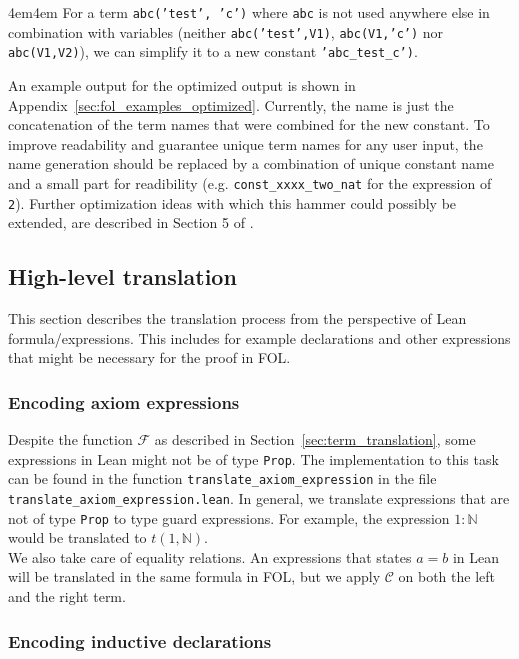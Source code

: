 \documentclass[a4paper]{article}
\newcommand{\F}[0]{$\mathcal{F}$ }
\newcommand{\C}[0]{$\mathcal{C}$ }
\begin{document}
\begingroup
\leftskip4em\rightskip4em
For a term \texttt{abc('test', 'c')} where \texttt{abc} is not used anywhere else in combination with variables (neither \texttt{abc('test',V1)}, \texttt{abc(V1,'c')} nor \texttt{abc(V1,V2)}), we can simplify it to a new constant \texttt{'abc\_test\_c')}.
\par
\endgroup

An example output for the optimized output is shown in Appendix~\ref{sec:fol_examples_optimized}. Currently, the name is just the concatenation of the term names that were combined for the new constant. To improve readability and guarantee unique term names for any user input, the name generation should be replaced by a combination of unique constant name and a small part for readibility (e.g. \texttt{const\_xxxx\_two\_nat} for the expression of \texttt{2}).
Further optimization ideas with which this hammer could possibly be extended, are described in Section 5 of \cite{CoqHammer}. 

\subsection{High-level translation}

This section describes the translation process from the perspective of Lean formula/expressions. This includes for example declarations and other expressions that might be necessary for the proof in FOL.

\subsubsection{Encoding axiom expressions}
\label{sec:axiom_expressions}

Despite the function \F as described in Section~\ref{sec:term_translation}, some expressions in Lean might not be of type \texttt{Prop}. The implementation to this task can be found in the function \texttt{translate\_axiom\_expression} in the file \texttt{translate\_axiom\_expression.lean}. In general, we translate expressions that are not of type \texttt{Prop} to type guard expressions. For example, the expression $1 : \mathbb{N}$ would be translated to $t(1, \mathbb{N})$.\\
We also take care of equality relations. An expressions that states $a=b$ in Lean will be translated in the same formula in FOL, but we apply \C on both the left and the right term.

\subsubsection{Encoding inductive declarations}
\end{document}
